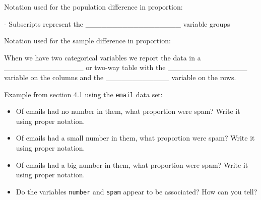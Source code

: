 \documentclass[
]{report}
\providecommand{\tightlist}{%
  \setlength{\itemsep}{0pt}\setlength{\parskip}{0pt}}
\newcommand{\rgi}{\hspace{24pt}}  %
\begin{document}
Notation used for the population difference in proportion:

\vspace{0.2in}

\rgi \rgi - Subscripts represent the \_\_\_\_\_\_\_\_\_\_\_\_\_\_\_\_\_\_ variable groups

Notation used for the sample difference in proportion:

\vspace{0.2in}

When we have two categorical variables we report the data in a \_\_\_\_\_\_\_\_\_\_\_\_\_\_\_ or two-way table with the \_\_\_\_\_\_\_\_\_\_\_\_\_\_\_ variable on the columns and the \_\_\_\_\_\_\_\_\_\_\_\_ variable on the rows.


\vspace{2mm}

Example from section 4.1 using the \texttt{email} data set:

\begin{itemize}
\tightlist
\item
  Of emails had no number in them, what proportion were spam? Write it using proper notation.
\end{itemize}

\vspace{0.3in}

\begin{itemize}
\tightlist
\item
  Of emails had a small number in them, what proportion were spam? Write it using proper notation.
\end{itemize}

\vspace{0.3in}

\begin{itemize}
\tightlist
\item
  Of emails had a big number in them, what proportion were spam? Write it using proper notation.
\end{itemize}

\vspace{0.3in}

\begin{itemize}
\tightlist
\item
  Do the variables \texttt{number} and \texttt{spam} appear to be associated? How can you tell?
\end{itemize}

\vspace{0.5in}
\end{document}
